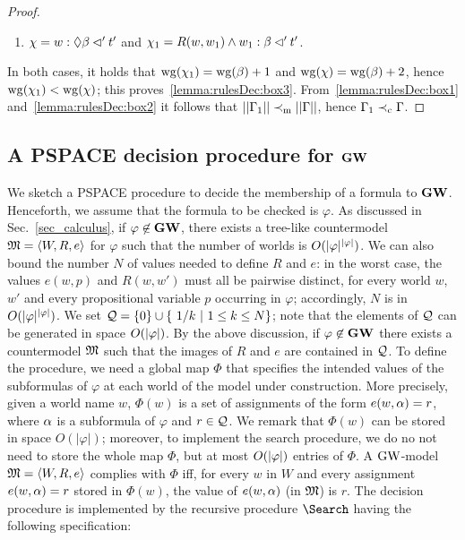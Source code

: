 \begin{proof}
\begin{enumerate}[label=(\alph*), ref=(\alph*),leftmargin=*]
\item\label{lemma:rulesDec:box3b}
  $\chi = w:\lozenge \beta \lhd' t'$ and $\chi_1 = R(w,w_1)\land w_1 : \beta \lhd' t'$.
\end{enumerate}
In both cases, it holds that $\mathrm{wg}(\chi_1)= \mathrm{wg}(\beta) +1$ and $\mathrm{wg}(\chi)=
\mathrm{wg}(\beta) +2$, hence $\mathrm{wg}(\chi_1) < \mathrm{wg}(\chi)$; this
proves~\ref{lemma:rulesDec:box3}.  From~\ref{lemma:rulesDec:box1}
and~\ref{lemma:rulesDec:box2} it follows that $||\Gamma_1||\prec_{\mathrm{m}}
||\Gamma||$, hence $\Gamma_1\prec_{\mathrm{c}} \Gamma$.
\end{proof}


\subsection{A PSPACE decision procedure for $\mathbf{GW}$}\label{app:pspace}

We sketch a PSPACE procedure to decide the membership of a formula to
$\mathbf{GW}$.  Henceforth, we assume that the formula to be checked is
$\varphi$.  As discussed in Sec.~\ref{sec_calculus}, if
$\varphi\not\in\mathbf{GW}$, there exists a tree-like countermodel
$\mathfrak{M}=\langle W,R,e \rangle$ for $\varphi$ such that the number of worlds is
$O(|\varphi|^{|\varphi|})$.  We can also bound the number
$N$ of values needed to define $R$ and $e$: in the worst case, the
values $e(w,p)$ and $R(w,w')$ must all be pairwise distinct, for every
world $w$, $w'$ and every propositional variable $p$ occurring in
$\varphi$; accordingly, $N$ is in
$O(|\varphi|^{|\varphi|})$.  We set
$\mathcal{Q}=\{0\}\cup\{~1/k~|~1\leq k\leq N\}$; note that the elements of
$\mathcal{Q}$ can be generated in space $O(|\varphi|)$.  By the above
discussion, if $\varphi\not\in\mathbf{GW}$ there exists a countermodel $\mathfrak{M}$
such that the images of $R$ and $e$ are contained in $\mathcal{Q}$.  To
define the procedure, we need a global map $\Phi$ that specifies the
intended values of the subformulas of $\varphi$ at each world of the
model under construction.  More precisely, given a world name $w$,
$\Phi(w)$ is a set of assignments of the form $e(w,\alpha)=r$,  where $\alpha$ is a subformula of $\varphi$ and
$r\in\mathcal{Q}$. We remark that $\Phi(w)$ can be stored in space
$O(|\varphi|)$; moreover, to implement the search procedure, we do no
not need to store the whole map $\Phi$, but at most
$O(|\varphi|)$ entries of $\Phi$.  A $\mbox{$\mathrm{GW}$}$-model
$\mathfrak{M}=\langle W,R,e \rangle$ complies with $\Phi$ iff, for every $w$ in $W$
and every assignment $e(w,\alpha)=r$ stored in $\Phi(w)$, the value of
$e(w,\alpha)$ (in $\mathfrak{M}$) is $r$.  The decision procedure is implemented by
the recursive procedure $\Search$ having the following specification:

